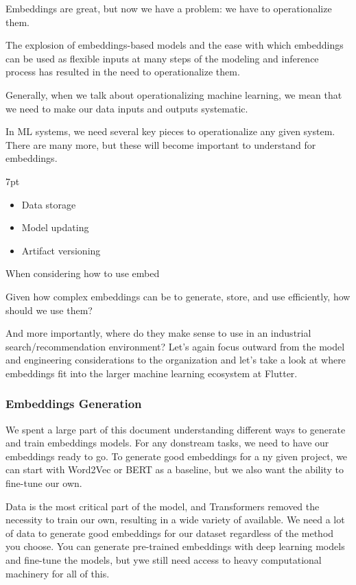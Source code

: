 \documentclass[11pt, table]{diazessay} %
\newenvironment{formal}{%
  \def\FrameCommand{%
    \hspace{1pt}%
    {\color{w_lightblue}\vrule width 2pt}%
    {\color{formalshade}\vrule width 4pt}%
    \colorbox{formalshade}%
  }%
  \MakeFramed{\advance\hsize-\width\FrameRestore}%
  \noindent\hspace{-4.55pt}%
  \begin{adjustwidth}{}{7pt}%
  \vspace{2pt}\vspace{2pt}%
}
{%
  \vspace{2pt}\end{adjustwidth}\endMakeFramed%
}
\begin{document}
\begin{sloppypar}
Embeddings are great, but now we have a problem: we have to operationalize them. 

The explosion of embeddings-based models and the ease with which embeddings can be used as flexible inputs at many steps of the modeling and inference process has resulted in the need to operationalize them.

Generally, when we talk about operationalizing machine learning, we mean that we need to make our data inputs and outputs systematic. 

In ML systems, we need several key pieces to operationalize any given system. There are many more, but these will become important to understand for embeddings. 

\begin{formal}
\begin{itemize}
  \item Data storage
  \item Model updating
  \item Artifact versioning
\end{itemize}
\end{formal}



When considering how to use embed

Given how complex embeddings can be to generate, store, and use efficiently, how should we use them? 

And more importantly, where do they make sense to use in an industrial search/recommendation environment? Let’s again focus outward from the model and engineering considerations to the organization and let's take a look at where embeddings fit into the larger machine learning ecosystem at Flutter. 


\subsubsection{Embeddings Generation}

We spent a large part of this document understanding different ways to generate and train embeddings models. For any donstream tasks, we need to have our embeddings ready to go. To generate good embeddings for a ny given project, we can start with Word2Vec or BERT as a baseline, but we also want the ability to fine-tune our own.

Data is the most critical part of the model, and Transformers removed the necessity to train our own, resulting in a wide variety of available. We need a lot of data to generate good embeddings for our dataset regardless of the method you choose. You can generate pre-trained embeddings with deep learning models and fine-tune the models, but ywe still need access to heavy computational machinery for all of this. 


\end{sloppypar}
\end{document}
